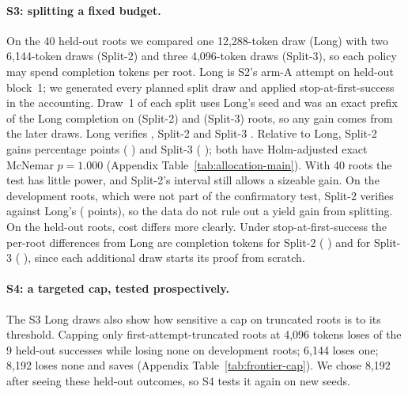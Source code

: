 \paragraph{S3: splitting a fixed budget.}
On the 40 held-out roots we compared one 12,288-token draw (Long) with two 6,144-token draws (Split-2) and three 4,096-token draws (Split-3), so each policy may spend \TokenCap{} completion tokens per root.  Long is S2's arm-A attempt on held-out block~1; we generated every planned split draw and applied stop-at-first-success in the accounting.  Draw~1 of each split uses Long's seed and was an exact prefix of the Long completion on \AllocSplitTwoPrefix{} (Split-2) and \AllocSplitThreePrefix{} (Split-3) roots, so any gain comes from the later draws.  Long verifies \AllocLongFrac{}, Split-2 \AllocSplitTwoFrac{} and Split-3 \AllocSplitThreeFrac{}.  Relative to Long, Split-2 gains \AllocSplitTwoLongEffPts{} percentage points (\ci{} \AllocSplitTwoLongCI{}) and Split-3 \AllocSplitThreeLongEffPts{} (\ci{} \AllocSplitThreeLongCI{}); both have Holm-adjusted exact McNemar $p=1.000$ (Appendix Table~\ref{tab:allocation-main}).  With 40 roots the test has little power, and Split-2's interval still allows a sizeable gain.  On the \AllocDevN{} development roots, which were not part of the confirmatory test, Split-2 verifies \AllocDevSplitTwoVerified{} against Long's \AllocDevLongVerified{} (\AllocDevSplitTwoLongEffPts{} points), so the data do not rule out a yield gain from splitting.  On the held-out roots, cost differs more clearly.  Under stop-at-first-success the per-root differences from Long are \AllocSplitTwoDeltaTokens{} completion tokens for Split-2 (\ci{} \AllocSplitTwoDeltaTokensCI{}) and \AllocSplitThreeDeltaTokens{} for Split-3 (\ci{} \AllocSplitThreeDeltaTokensCI{}), since each additional draw starts its proof from scratch.

\paragraph{S4: a targeted cap, tested prospectively.}
The S3 Long draws also show how sensitive a cap on truncated roots is to its threshold.  Capping only first-attempt-truncated roots at 4,096 tokens loses \ClassCapEvalLoss{} of the 9 held-out successes while losing none on development roots; 6,144 loses one; 8,192 loses none and saves \ClassCapEvalEightSaving{} (Appendix Table~\ref{tab:frontier-cap}).  We chose 8,192 after seeing these held-out outcomes, so S4 tests it again on new seeds.

